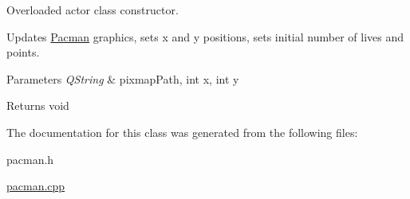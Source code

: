 Overloaded actor class constructor. 

Updates \mbox{\hyperlink{class_pacman}{Pacman}} graphics, sets x and y positions, sets initial number of lives and points. 
\begin{DoxyParams}{Parameters}
{\em Q\+String} & pixmap\+Path, int x, int y \\
\hline
\end{DoxyParams}
\begin{DoxyReturn}{Returns}
void 
\end{DoxyReturn}


The documentation for this class was generated from the following files\+:\begin{DoxyCompactItemize}
\item 
pacman.\+h\item 
\mbox{\hyperlink{pacman_8cpp}{pacman.\+cpp}}\end{DoxyCompactItemize}
